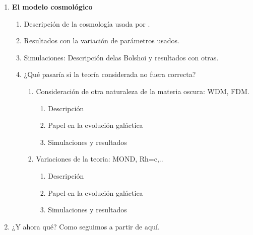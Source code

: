 \begin{enumerate}
	\item \textbf{El modelo cosmológico}
	\begin{enumerate}[{5.}1]
		\item Descripción de la cosmología usada por \cite{steinhardt2016impossibly}.
		\item Resultados con la variación de parámetros usados.
		\item Simulaciones: Descripción delas Bolshoi y resultados con otras.
		\item ¿Qué pasaría si la teoría considerada no fuera correcta?
		\begin{enumerate}[{5.4.}1]
			\item Consideración de otra naturaleza de la materia oscura: WDM, FDM.
			\begin{enumerate}[{5.4.1.}1]
				\item Descripción
				\item Papel en la evolución galáctica
				\item Simulaciones y resultados
			\end{enumerate}
			\item Variaciones de la teoria: MOND, Rh=c,..
			\begin{enumerate}[{5.5.}1]
				\item Descripción
				\item Papel en la evolución galáctica
				\item Simulaciones y resultados
			\end{enumerate}
		\end{enumerate}
	\end{enumerate}
	
	\item ¿Y ahora qué? Como seguimos a partir de aquí.
\end{enumerate}

\newpage
